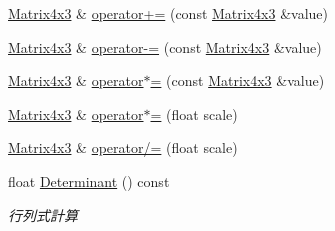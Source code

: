 \begin{DoxyCompactItemize}
\mbox{\hyperlink{struct_math_1_1_matrix4x3}{Matrix4x3}} \& \mbox{\hyperlink{struct_math_1_1_matrix4x3_abb52d4ffdbc905e8628f4e6595bcd42e}{operator+=}} (const \mbox{\hyperlink{struct_math_1_1_matrix4x3}{Matrix4x3}} \&value)
\item 
\mbox{\hyperlink{struct_math_1_1_matrix4x3}{Matrix4x3}} \& \mbox{\hyperlink{struct_math_1_1_matrix4x3_ae19b8a9dd5d0504eaaa55e3e733a6902}{operator-\/=}} (const \mbox{\hyperlink{struct_math_1_1_matrix4x3}{Matrix4x3}} \&value)
\item 
\mbox{\hyperlink{struct_math_1_1_matrix4x3}{Matrix4x3}} \& \mbox{\hyperlink{struct_math_1_1_matrix4x3_a27485d5879ecd028ce4f66363e0a7608}{operator$\ast$=}} (const \mbox{\hyperlink{struct_math_1_1_matrix4x3}{Matrix4x3}} \&value)
\item 
\mbox{\hyperlink{struct_math_1_1_matrix4x3}{Matrix4x3}} \& \mbox{\hyperlink{struct_math_1_1_matrix4x3_acbd4b417e9851ef61853fb7238818d01}{operator$\ast$=}} (float scale)
\item 
\mbox{\hyperlink{struct_math_1_1_matrix4x3}{Matrix4x3}} \& \mbox{\hyperlink{struct_math_1_1_matrix4x3_a1e9eeddbba107f17c1a301fc0216a525}{operator/=}} (float scale)
\item 
float \mbox{\hyperlink{struct_math_1_1_matrix4x3_af7507bc7b4ad0801c785ee45d8086063}{Determinant}} () const
\begin{DoxyCompactList}\small\item\em 行列式計算 \end{DoxyCompactList}\end{DoxyCompactItemize}
